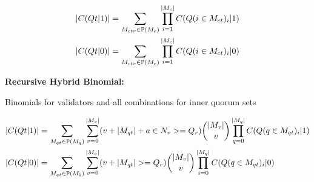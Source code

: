 \documentclass[10pt]{article}
\begin{document}
\begin{align}
  \left\vert{ C(Qt|1) }\right\vert &=
        \sum_{ M_{ctr} \in \mathbb{P}( M_{c} ) }
        \prod_{i=1}^{ \left\vert{M_c}\right\vert }
                C(Q(i \in M_{ct})_i|1)
  \\
  \left\vert{ C(Qt|0) }\right\vert &=
        \sum_{ M_{ctr} \in \mathbb{P}( M_{c} ) }
        \prod_{i=1}^{ \left\vert{M_c}\right\vert }
                C(Q(i \in M_{ct})_i|0)
\end{align}


\textbf{Recursive Hybrid Binomial:}\\\par
Binomials for validators and all combinations for inner quorum sets



\begin{align}
  \left\vert{ C(Qt|1) }\right\vert &=
        \sum_{ M_{qt} \in \mathbb{P}( M_{q} ) }
        \sum_{ v=0 }^{ \left\vert{M_v}\right\vert }
           (v + \left\vert{M_{qt}}\right\vert + a \in N_{v}>= Q_r)
           \binom{ \left\vert{M_v}\right\vert }{ v }
           \prod_{q=0}^{ \left\vert{M_q}\right\vert } C(Q(q \in M_{qt})_i|1)
  \\
  \left\vert{ C(Qt|0) }\right\vert &=
        \sum_{ M_{qt} \in \mathbb{P}( M_{1} ) }
        \sum_{ v=0 }^{ \left\vert{M_v}\right\vert }
           (v + \left\vert{M_{qt}}\right\vert >= Q_r)
           \binom{ \left\vert{M_v}\right\vert }{ v }
           \prod_{i=0}^{ \left\vert{M_q}\right\vert } C(Q(q \in M_{qt})_i|0)
\end{align}
\end{document}
